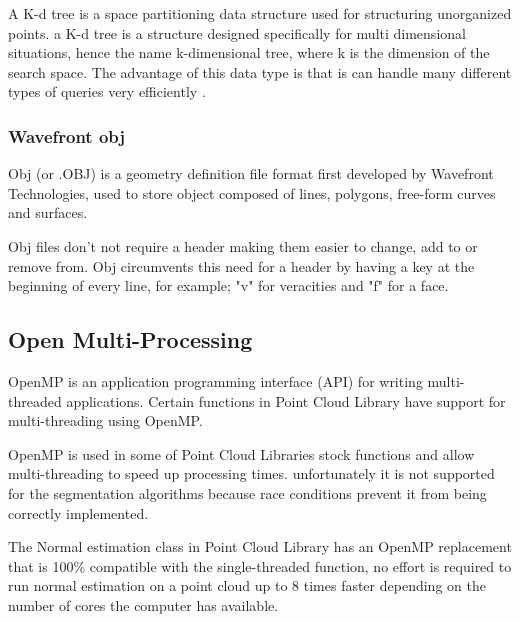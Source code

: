 			A K-d tree is a space partitioning data structure used for structuring unorganized points. a K-d tree is a structure designed specifically for multi dimensional situations, hence the name k-dimensional tree, where k is the dimension of the search space. The advantage of this data type is that is can handle many different types of queries very efficiently \citep{bentley_multidimensional_1975}.
		
		
		\subsubsection{Wavefront obj}
			Obj (or .OBJ) is a geometry definition file format first developed by Wavefront Technologies, used to store object composed of lines, polygons, free-form curves and surfaces.
			
			Obj files don't not require a header making them easier to change, add to or remove from. Obj circumvents this need for a header by having a key at the beginning of every line, for example; "v" for veracities and "f" for a face.
			 
			 
		
	
	\subsection{Open Multi-Processing}
		OpenMP is an application programming interface (API) for writing multi-threaded applications. Certain functions in Point Cloud Library have support for multi-threading using OpenMP.
		
		OpenMP is used in some of Point Cloud Libraries stock functions and allow multi-threading to speed up processing times. unfortunately it is not supported for the segmentation algorithms because race conditions prevent it from being correctly implemented. 
		
		The Normal estimation class in Point Cloud Library has an OpenMP replacement that is 100\% compatible with the single-threaded function, no effort is required to run normal estimation on a point cloud up to 8 times faster depending on the number of cores the computer has available.
	

	

	
